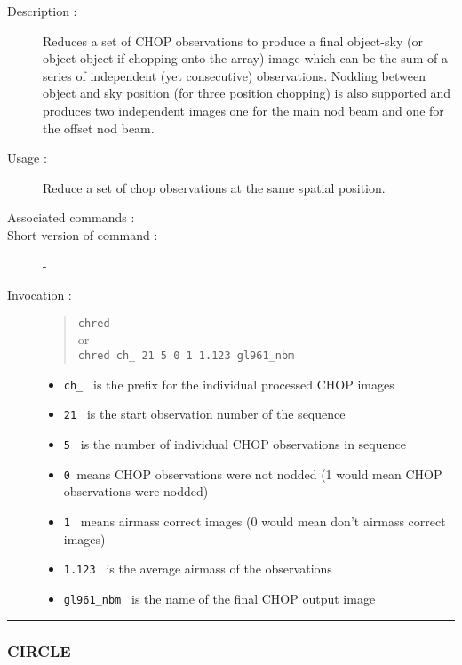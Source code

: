 \begin{description}

\item[Description :] Reduces a set of CHOP observations to produce a
final object-sky (or object-object if chopping onto the array) image
which can be the sum of a series of independent (yet consecutive)
observations. Nodding between object and sky position (for three
position chopping) is also supported and produces two independent
images one for the main nod beam and one for the offset nod beam.

\item[Usage :] Reduce a set of chop observations at the same spatial position.
\item[Associated commands :] {\tt {}}
\item[Short version of command :] -
\item[Invocation :]

\begin{quote}{\tt  chred }\\
or \\
{\tt chred ch\_ 21 5 0 1 1.123 gl961\_nbm }
\end{quote}

\begin{itemize}

\item {\tt ch\_ } is the prefix for the individual processed CHOP images
\item {\tt 21 } is the start observation number of the sequence
\item {\tt 5 } is the number of individual CHOP observations in sequence
\item {\tt 0 }means CHOP observations were not nodded
(1 would mean CHOP observations were  nodded)
\item {\tt 1 } means airmass correct images
(0 would mean don't airmass correct images)
\item {\tt 1.123 } is the average airmass of the observations
\item {\tt gl961\_nbm } is the name of the final CHOP output image
\end{itemize}

\end{description}

\hrule 
\subsubsection*{\label{CIRCLE}CIRCLE}

